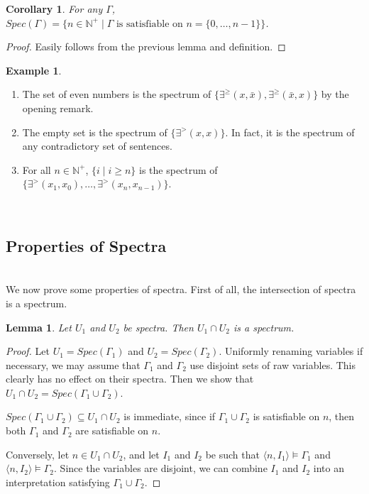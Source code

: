 \documentclass[12pt, reqno]{amsart}
\newtheorem{lemma}[theorem]{Lemma}
\newtheorem{corollary}[theorem]{Corollary}
\theoremstyle{definition}
\newtheorem{example}[theorem]{Example}
\theoremstyle{remark}
\numberwithin{equation}{section}
\begin{document}
\begin{corollary}
	For any $\Gamma$, $Spec(\Gamma) = \{n \in \mathbb{N}^+ \mid \mbox{$\Gamma$ is satisfiable on $n = \{0, \dots, n-1\}$} \}$.
\end{corollary}

\begin{proof}
	Easily follows from the previous lemma and definition. 
\end{proof}

\begin{example} 
	\begin{enumerate}
		\item The set of even numbers is the spectrum of $\{\exists^{\geq}(x, \bar{x}), \exists^{\geq}(\bar{x}, x)\}$ by the opening remark. 
		\item The empty set is the spectrum of $\{\exists^{>}(x, x)\}$. In fact, it is the spectrum of any contradictory set of sentences. 
		\item For all $n \in \mathbb{N}^+$, $\{i \mid i \geq n\}$ is the spectrum of $\{\exists^{>}(x_{1}, x_{0}), \dots, \exists^{>}(x_{n}, x_{n-1})\}$. 
	\end{enumerate}
\end{example}


\hfill \\ 

\subsection{Properties of Spectra} \hfill \\ 

We now prove some properties of spectra. First of all, the intersection of spectra is a spectrum. 

\begin{lemma}\label{intersection}
	Let $U_1$ and $U_2$ be spectra. Then $U_1 \cap U_2$ is a spectrum.
\end{lemma}

\begin{proof}
	Let $U_1 = Spec(\Gamma_1)$ and $U_2 = Spec(\Gamma_2)$. Uniformly renaming variables if necessary, we may assume that $\Gamma_1$ and $\Gamma_2$ use disjoint sets of raw variables. This clearly has no effect on their spectra. Then we show that $U_1 \cap U_2 = Spec(\Gamma_1 \cup \Gamma_2)$. 

	$Spec(\Gamma_1 \cup \Gamma_2) \subseteq U_1 \cap U_2$ is immediate, since if $\Gamma_1 \cup \Gamma_2$ is satisfiable on $n$, then both $\Gamma_1$ and $\Gamma_2$ are satisfiable on $n$.
	
	Conversely, let $n\in U_1\cap U_2$, and let $I_1$ and $I_2$ be such that $\langle n, I_1\rangle \models \Gamma_1$ and $\langle n, I_2\rangle \models \Gamma_2$. Since the variables are disjoint, we can combine $I_1$ and $I_2$ into an interpretation satisfying $\Gamma_1\cup\Gamma_2$.
\end{proof}
\end{document}
